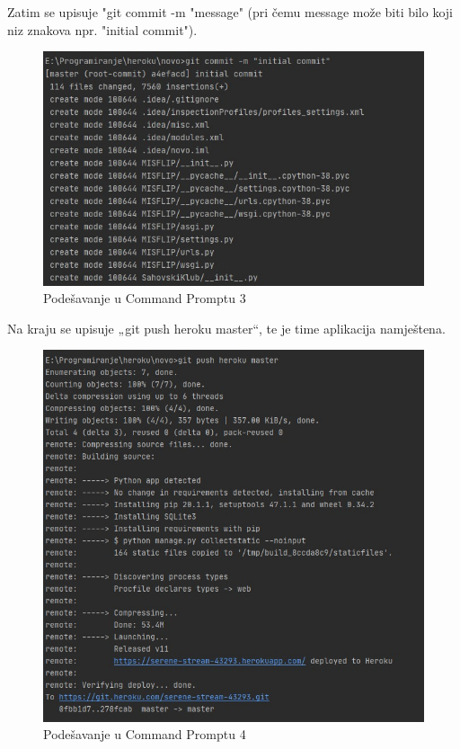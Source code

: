 			\eject
			
			\noindent Zatim se upisuje "git commit -m "message" (pri čemu message može biti bilo koji niz znakova npr. "initial commit").
			
			\begin{figure}[H]
				\centerfloat
				\includegraphics[scale=0.4]{slike/pustanjeupogon3.jpeg} %
				\caption{Podešavanje u Command Promptu 3}
				
			\end{figure}
			
			\noindent Na kraju se upisuje „git push heroku master“, te je time aplikacija namještena.
			
			\begin{figure}[H]
				\centerfloat
				\includegraphics[scale=0.4]{slike/pustanjeupogon4.jpeg} %
				\caption{Podešavanje u Command Promptu 4}
				
			\end{figure}
			
			\eject 